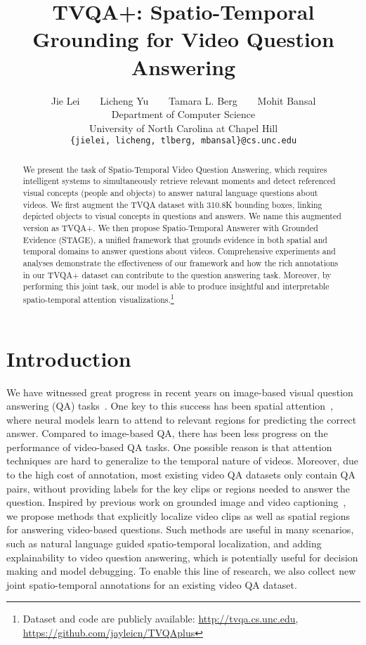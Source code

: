 \documentclass[11pt,a4paper]{article}
\title{TVQA+: Spatio-Temporal Grounding for Video Question Answering}
\author{
  Jie Lei $\;\;\;\;\;$ Licheng Yu $\;\;\;\;\;$ 
  Tamara L. Berg $\;\;\;\;\;$ Mohit Bansal \\
  Department of Computer Science \\ University of North Carolina at Chapel Hill \\
  {\tt \{jielei, licheng, tlberg, mbansal\}@cs.unc.edu} \\
}
\begin{document}
\maketitle
\begin{abstract}
We present the task of Spatio-Temporal Video Question Answering, which requires intelligent systems to simultaneously retrieve relevant moments and detect referenced visual concepts (people and objects) to answer natural language questions about videos. 
We first augment the TVQA dataset 
with 310.8K bounding boxes, linking depicted objects to visual concepts in questions and answers.
We name this augmented version as TVQA+.
We then propose Spatio-Temporal Answerer with Grounded Evidence (STAGE), a unified framework that grounds evidence in both spatial and temporal domains to answer questions about videos.
Comprehensive experiments and analyses demonstrate the effectiveness of our framework and how the rich annotations in our TVQA+ dataset can contribute to the question answering task.
Moreover, by performing this joint task, our model is able to produce insightful and interpretable spatio-temporal attention visualizations.\footnote{Dataset and code are publicly available: \url{http://tvqa.cs.unc.edu}, \url{https://github.com/jayleicn/TVQAplus}}
\end{abstract}


\section{Introduction}\label{intro}

We have witnessed great progress in recent years on image-based visual question answering (QA) tasks~\cite{Antol2015VQAVQ,Yu2015VisualMF,Zhu2016Visual7WGQ}.
One key to this success has been spatial attention~\cite{Anderson2017BottomUpAT,Shih2016WhereTL,Lu2016HierarchicalQC}, where neural models learn to attend to relevant regions for predicting the correct answer.
Compared to image-based QA, there has been less progress on the performance of video-based QA tasks.
One possible reason is that attention techniques are hard to generalize to the temporal nature of videos.
Moreover, due to the high cost of annotation, most existing video QA datasets only contain QA pairs, without providing labels for the key clips or regions needed to answer the question.
Inspired by previous work on grounded image and video captioning~\cite{Lu2018NeuralBT,Zhou2018GroundedVD}, we propose methods that explicitly localize video clips as well as spatial regions for answering video-based questions. 
Such methods are useful in many scenarios, such as natural language guided spatio-temporal localization, and adding explainability to video question answering, which is potentially useful for decision making and model debugging.
To enable this line of research, we also collect new joint spatio-temporal annotations for an existing video QA dataset.
\end{document}
